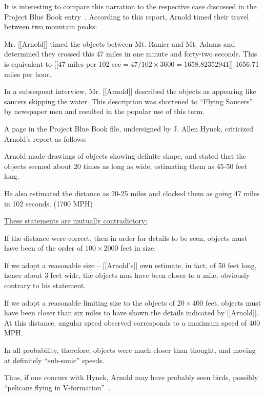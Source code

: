 It is interesting to compare this narration to the respective case discussed in the Project Blue Book entry~\cite{1947-KA-PBB}.
According to this report, Arnold timed their travel between two mountain peaks:
\begin{svgraybox}
Mr. [[Arnold]] timed the objects between Mt. Ranier and Mt. Adams and determined they crossed this 47 miles in one minute and forty-two seconds.
This is equivalent to [[47 miles per 102 sec$= 47/102 \times 3600=1658.82352941$]] 1656.71 miles per hour.

In a subsequent interview, Mr. [[Arnold]] described the objects as appearing like saucers skipping the water.
This description was shortened to ``Flying Saucers'' by newspaper men and resulted in the popular use of this term.
\end{svgraybox}

A page in the Project Blue Book file, undersigned by J. Allen Hynek, criticized Arnold's report as follows:
\begin{svgraybox}
Arnold made drawings of objects showing definite shape,
and stated that the objects seemed about 20 times as long as wide, estimating them as 45-50 feet long.

He also estimated the distance as 20-25 miles and clocked them as going 47 miles in 102 seconds. (1700 MPH)

\underline{These statements are mutually contradictory:}

If the distance were correct, then in order for details to be seen, objects must have been of the order of $ 100 \times 2000 $ feet in size.

If we adopt a reasonable size -- [[Arnold's]] own estimate, in fact, of 50 feet long, hence about 3 feet wide, the objects mus have been closer to a mile,
obviously contrary to his statement.

If we adopt a reasonable limiting size to the objects of $ 20 \times 400 $ feet,
objects must have been closer than six miles to have shown the details indicated by [[Arnold]].
At this distance, angular speed observed corresponds to a maximum speed of 400 MPH.

In all probability, therefore, objects were much closer than thought, and moving at definitely ``sub-sonic'' speeds.
\end{svgraybox}

Thus, if one concurs with Hynek, Arnold may have probably seen birds, possibly ``pelicans flying in V-formation''~\cite{Maccabee2017Jun}.

